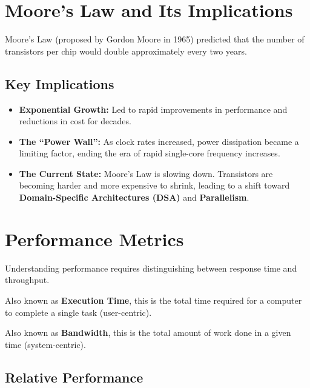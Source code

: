 \section{Moore's Law and Its Implications}

\begin{definition}
Moore's Law (proposed by Gordon Moore in 1965) predicted that the number of transistors per chip would double approximately every two years.
\end{definition}

\subsection{Key Implications}

\begin{itemize}
    \item \textbf{Exponential Growth:} Led to rapid improvements in performance and reductions in cost for decades.
    \item \textbf{The ``Power Wall'':} As clock rates increased, power dissipation became a limiting factor, ending the era of rapid single-core frequency increases.
    \item \textbf{The Current State:} Moore's Law is slowing down. Transistors are becoming harder and more expensive to shrink, leading to a shift toward \textbf{Domain-Specific Architectures (DSA)} and \textbf{Parallelism}.
\end{itemize}

\section{Performance Metrics}

Understanding performance requires distinguishing between response time and throughput.

\begin{vocabulary}
Also known as \textbf{Execution Time}, this is the total time required for a computer to complete a single task (user-centric).
\end{vocabulary}

\begin{vocabulary}[Throughput]
Also known as \textbf{Bandwidth}, this is the total amount of work done in a given time (system-centric).
\end{vocabulary}

\subsection{Relative Performance}

